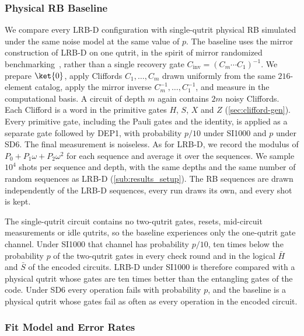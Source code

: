 \subsubsection{Physical RB Baseline}
\label{sub:rb_baseline}

We compare every LRB-D configuration with single-qutrit physical RB simulated under the same noise model at the same value of $p$. The baseline uses the mirror construction of LRB-D on one qutrit, in the spirit of mirror randomized benchmarking~\cite{Proctor2022MirrorRB}, rather than a single recovery gate $C_{\text{inv}} = (C_m \cdots C_1)^{-1}$. We prepare $\ket{0}$, apply Cliffords $C_1, \dots, C_m$ drawn uniformly from the same $216$-element catalog, apply the mirror inverse $C_m^{-1}, \dots, C_1^{-1}$, and measure in the computational basis. A circuit of depth $m$ again contains $2m$ noisy Cliffords. Each Clifford is a word in the primitive gates $H$, $S$, $X$ and $Z$ (\autoref{sec:clifford-gen}). Every primitive gate, including the Pauli gates and the identity, is applied as a separate gate followed by DEP1, with probability $p/10$ under SI1000 and $p$ under SD6. The final measurement is noiseless. As for LRB-D, we record the modulus of $P_0 + P_1\omega + P_2\omega^2$ for each sequence and average it over the sequences. We sample $10^4$ shots per sequence and depth, with the same depths and the same number of random sequences as LRB-D (\autoref{sub:results_setup}). The RB sequences are drawn independently of the LRB-D sequences, every run draws its own, and every shot is kept.

The single-qutrit circuit contains no two-qutrit gates, resets, mid-circuit measurements or idle qutrits, so the baseline experiences only the one-qutrit gate channel. Under SI1000 that channel has probability $p/10$, ten times below the probability $p$ of the two-qutrit gates in every check round and in the logical $\bar H$ and $\bar S$ of the encoded circuits. LRB-D under SI1000 is therefore compared with a physical qutrit whose gates are ten times better than the entangling gates of the code. Under SD6 every operation fails with probability $p$, and the baseline is a physical qutrit whose gates fail as often as every operation in the encoded circuit.

\subsubsection{Fit Model and Error Rates}
\label{sub:fit_model}

